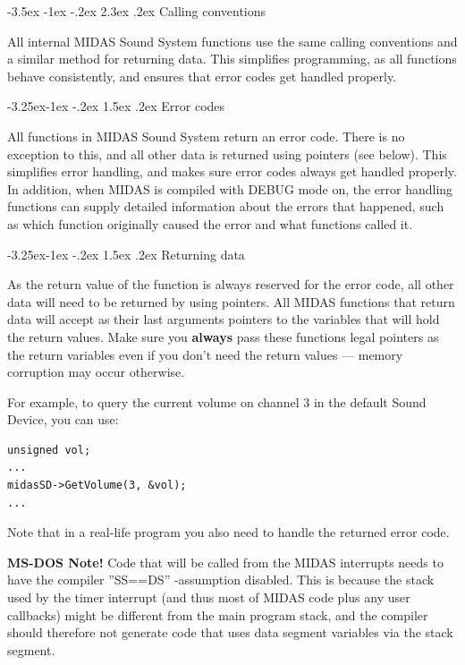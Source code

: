 \documentclass[a4paper,12pt,oneside]{book}
\makeatletter
\renewcommand\section{\@startsection {section}{1}{-20pt}%
                                   {-3.5ex \@plus -1ex \@minus -.2ex}%
                                   {2.3ex \@plus.2ex}%
                                   {\normalfont\Large\bfseries}}
\renewcommand\subsection{\@startsection{subsection}{2}{-20pt}%
                                     {-3.25ex\@plus -1ex \@minus -.2ex}%
                                     {1.5ex \@plus .2ex}%
                                     {\normalfont\large\bfseries}}
\makeatother
\begin{document}
\section{Calling conventions}

All internal MIDAS Sound System functions use the same calling conventions and
a similar method for returning data. This simplifies programming, as all
functions behave consistently, and ensures that error codes get handled
properly.

\subsection{Error codes}

All functions in MIDAS Sound System return an error code. There is no
exception to this, and all other data is returned using pointers (see below).
This simplifies error handling, and makes sure error codes always get handled
properly. In addition, when MIDAS is compiled with DEBUG mode on, the error
handling functions can supply detailed information about the errors that
happened, such as which function originally caused the error and what
functions called it.

\subsection{Returning data}

As the return value of the function is always reserved for the error code,
all other data will need to be returned by using pointers. All MIDAS
functions that return data will accept as their last arguments pointers to
the variables that will hold the return values. Make sure you {\bf always}
pass these functions legal pointers as the return variables even if you don't
need the return values --- memory corruption may occur otherwise.

For example, to query the current volume on channel 3 in the default Sound
Device, you can use:

\begin{verbatim}
unsigned vol;
...
midasSD->GetVolume(3, &vol);
...
\end{verbatim}

Note that in a real-life program you also need to handle the returned error
code.

{\bf MS-DOS Note!} Code that will be called from the MIDAS interrupts
needs to have the compiler ''SS==DS'' -assumption disabled. This is
because the stack used by the timer interrupt (and thus most of MIDAS
code plus any user callbacks) might be different from the main program 
stack, and the compiler should
therefore not generate code that uses data segment variables via the stack
segment. 
\end{document}
